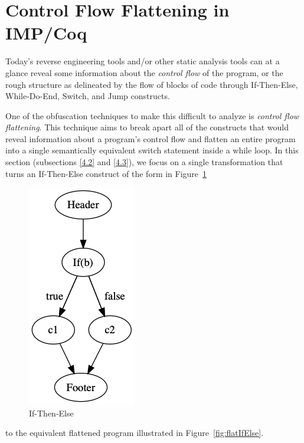 \documentclass[compsoc,conference,a4paper,10pt,times]{IEEEtran}
\begin{document}
\section{Control Flow Flattening in IMP/Coq}\label{sec:flattening}
Today's reverse engineering tools and/or other static analysis tools can at a glance reveal some information about the \emph{control flow} of the program, or the rough structure as delineated by the flow of blocks of code through If-Then-Else, While-Do-End, Switch, and Jump constructs. 


One of the obfuscation techniques to make this difficult to analyze is \emph{control flow flattening}. This technique aims to break apart all of the constructs that would reveal information about a program's control flow and flatten an entire program into a single semantically equivalent switch statement inside a while loop.  
In this section (subsections \ref{4.2} and \ref{4.3}), we focus on a single transformation that turns an If-Then-Else construct of the form in Figure~\ref{fig:ifElse}
%
\begin{figure}[hbt]
\centering
\includegraphics[scale=0.27]{ifElse}
\caption{If-Then-Else}
 \label{fig:ifElse}
\end{figure}
to the equivalent flattened program illustrated in Figure~\ref{fig:flatIfElse}.
\end{document}
